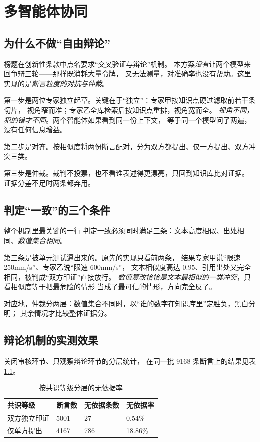 \chapter{多智能体协同}

\section{为什么不做“自由辩论”}

榜题在创新性条款中点名要求“交叉验证与辩论”机制。
本方案\emph{没有}让两个模型来回争辩三轮——那样既消耗大量令牌，
又无法测量，对准确率也没有帮助。这里实现的是\emph{断言粒度的对抗与仲裁}。

第一步是两位专家独立起草。关键在于“独立”：专家甲按知识点硬过滤取前若干条切片，
视角窄而准；专家乙全库检索后按知识点重排，视角宽而全。
\emph{视角不同，犯的错才不同}。两个智能体如果看到同一份上下文，
等于同一个模型问了两遍，没有任何信息增益。

第二步是对齐。按相似度将两份断言配对，分为双方都提出、仅一方提出、双方冲突三类。

第三步是仲裁。裁判不投票，也不看谁表述得更漂亮，只回到知识库比对证据。
证据分差不足时两条都弃用。

\section{判定“一致”的三个条件}

\begin{keynote}{整个机制里最关键的一行}
判定一致必须同时满足三条：文本高度相似、出处相同、\emph{数值集合相同}。

第三条是被单元测试逼出来的。原先的实现只看前两条，
结果专家甲说“限速 250\unit{mm/s}”、专家乙说“限速 600\unit{mm/s}”，
文本相似度高达 $0.95$、引用出处又完全相同，被判成“双方印证”直接放行。
\emph{数值篡改恰恰是文本最相似的一类冲突}，只看相似度等于把最危险的情形
当成了最可信的情形，方向完全反了。
\end{keynote}

对应地，仲裁分两层：数值集合不同时，以“谁的数字在知识库里”定胜负，黑白分明；
其余情况才比较整体证据分。

\section{辩论机制的实测效果}

关闭审核环节、只观察辩论环节的分层统计，
在同一批 9168 条断言上的结果见表 \ref{tab:consensus}。

\begin{table}[htbp]\centering\small
\caption{按共识等级分层的无依据率}\label{tab:consensus}
\begin{tabular}{@{}p{3.4cm}p{2.4cm}p{2.6cm}p{2.4cm}@{}}
\toprule
共识等级 & 断言数 & 无依据条数 & 无依据率 \\
\midrule
双方独立印证 & 5001 & 27 & 0.54\% \\
仅单方提出 & 4167 & 786 & 18.86\% \\
\bottomrule
\end{tabular}
\end{table}

